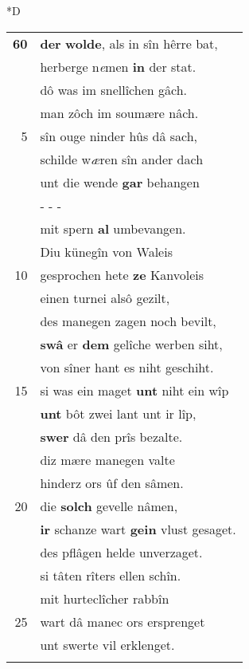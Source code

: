 \documentclass[8pt,a4paper,notitlepage]{article}
\begin{document}
\begin{table}[ht]
\begin{minipage}[t]{0.5\linewidth}
\small
\begin{center}*D
\end{center}
\begin{tabular}{rl}
\textbf{60} & \textbf{der} \textbf{wolde}, als in sîn hêrre bat,\\ 
 & herberge n\textit{e}men \textbf{in} der stat.\\ 
 & dô was im snellîchen gâch.\\ 
 & man zôch im soumære nâch.\\ 
5 & sîn ouge ninder hûs dâ sach,\\ 
 & schilde w\textit{æ}ren sîn ander dach\\ 
 & unt die wende \textbf{gar} behangen\\ 
 & \multicolumn{1}{l}{ - - - }\\ 
 & mit spern \textbf{al} umbevangen.\\ 
 & Diu künegîn von Waleis\\ 
10 & gesprochen hete \textbf{ze} Kanvoleis\\ 
 & einen turnei alsô gezilt,\\ 
 & des manegen zagen noch bevilt,\\ 
 & \textbf{swâ} er \textbf{dem} gelîche werben siht,\\ 
 & von sîner hant es niht geschiht.\\ 
15 & si was ein maget \textbf{unt} niht ein wîp\\ 
 & \textbf{unt} bôt zwei lant unt ir lîp,\\ 
 & \textbf{swer} dâ den prîs bezalte.\\ 
 & diz mære manegen valte\\ 
 & hinderz ors ûf den sâmen.\\ 
20 & die \textbf{solch} gevelle nâmen,\\ 
 & \textbf{ir} schanze wart \textbf{gein} vlust gesaget.\\ 
 & des pflâgen helde unverzaget.\\ 
 & si tâten rîters ellen schîn.\\ 
 & mit hurteclîcher rabbîn\\ 
25 & wart dâ manec ors ersprenget\\ 
 & unt swerte vil erklenget.\\ 
 & \textit{\begin{large}E\end{large}}in schifbrücke \textbf{ûf} \textbf{einem} plân\\ 

\end{tabular}
\end{minipage}
\end{table}
\end{document}

